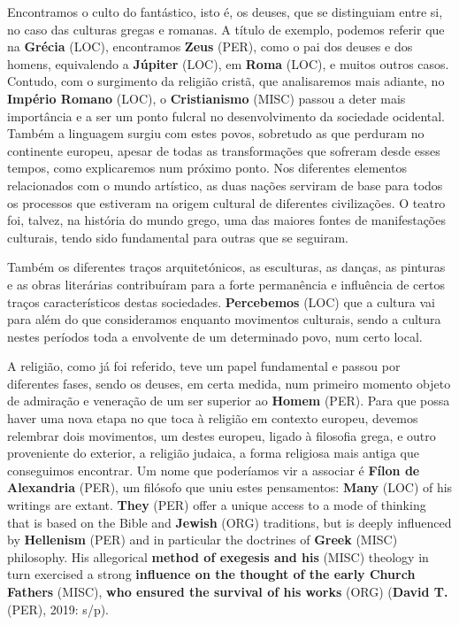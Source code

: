 \documentclass[12pt,a4paper]{article}
\begin{document}
Encontramos o culto do fantástico, isto é, os deuses, que se distinguiam entre si, no caso das  culturas  gregas  e  romanas.  A  título  de  exemplo,  podemos  referir  que  na  \textbf{Grécia} (LOC), encontramos \textbf{Zeus} (PER), como o pai dos deuses e dos homens, equivalendo a \textbf{Júpiter} (LOC), em \textbf{Roma} (LOC), e muitos outros casos. Contudo, com o surgimento da religião cristã, que analisaremos mais adiante, no \textbf{Império Romano} (LOC), o \textbf{Cristianismo} (MISC) passou a deter mais importância e a ser um  ponto  fulcral  no  desenvolvimento  da  sociedade  ocidental.  Também  a  linguagem surgiu  com  estes  povos,  sobretudo  as  que  perduram  no  continente  europeu,  apesar  de todas  as  transformações  que  sofreram  desde  esses  tempos,  como  explicaremos  num próximo  ponto.  Nos diferentes  elementos relacionados com  o mundo  artístico, as duas nações  serviram  de  base  para  todos  os  processos  que  estiveram  na  origem  cultural  de diferentes civilizações. O teatro foi, talvez, na história do mundo grego, uma das maiores fontes de manifestações culturais, tendo sido fundamental para outras que se seguiram.

Também  os  diferentes  traços  arquitetónicos,  as  esculturas,  as  danças,  as  pinturas  e  as obras  literárias  contribuíram  para  a  forte  permanência  e  influência  de  certos  traços característicos  destas  sociedades.  \textbf{Percebemos} (LOC)  que  a  cultura  vai  para  além  do  que consideramos  enquanto  movimentos  culturais,  sendo  a  cultura  nestes  períodos  toda  a envolvente de um determinado povo, num certo local.

A religião, como já foi referido, teve um papel fundamental e passou por diferentes fases, sendo os deuses, em certa medida, num primeiro momento objeto de admiração e veneração de um ser superior ao \textbf{Homem} (PER). Para que possa haver uma nova etapa no que toca  à  religião  em  contexto  europeu,  devemos  relembrar  dois  movimentos,  um  destes europeu,  ligado  à  filosofia  grega,  e  outro  proveniente  do  exterior,  a  religião  judaica,  a forma religiosa mais antiga que conseguimos encontrar. Um nome que poderíamos vir a associar é \textbf{Fílon de Alexandria} (PER), um filósofo que uniu estes pensamentos: \textbf{Many} (LOC) of his writings are extant. \textbf{They} (PER) offer a unique access to a mode of thinking that is based on the Bible and \textbf{Jewish} (ORG) traditions, but is deeply influenced by \textbf{Hellenism} (PER) and in particular the doctrines of \textbf{Greek} (MISC) philosophy. His allegorical \textbf{method of exegesis and his} (MISC) theology in turn exercised a strong \textbf{influence on the thought of the early Church Fathers} (MISC), \textbf{who ensured the survival of his works} (ORG) (\textbf{David T.} (PER), 2019: s/p).
\end{document}

